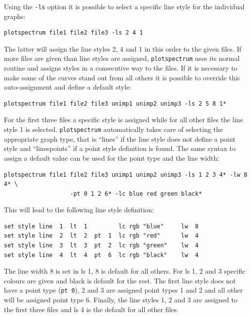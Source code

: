 \documentclass[12pt, a4paper]{article}
\begin{document}
Using the \verb'-ls' option it is possible to select a specific line style for the individual graphs:

\begin{verbatim}
plotspectrum file1 file2 file3 -ls 2 4 1
\end{verbatim}

The latter will assign the line styles 2, 4 and 1 in this order to the given files. If more files are given than line styles are assigned, \verb'plotspectrum' uses its normal routine and assigns styles in a consecutive way to the files. If it is necessary to make some of the curves stand out from all others it is possible to override this auto-assignment and define a default style:

\begin{verbatim}
plotspectrum file1 file2 file3 unimp1 unimp2 unimp3 -ls 2 5 8 1*
\end{verbatim}

For the first three files a specific style is assigned while for all other files the line style 1 is selected. \verb'plotspectrum' automatically takes care of selecting the appropriate graph type, that is ``lines'' if the line style does not define a point style and ``linespoints'' if a point style definition is found. The same syntax to assign a default value can be used for the point type and the line width:

\begin{verbatim}
plotspectrum file1 file2 file3 unimp1 unimp2 unimp3 -ls 1 2 3 4* -lw 8 4* \
                   -pt 0 1 2 6* -lc blue red green black*
\end{verbatim}

This will lead to the following line style definition:

\begin{verbatim}
set style line  1  lt  1         lc rgb "blue"     lw  8
set style line  2  lt  2  pt  1  lc rgb "red"      lw  4
set style line  3  lt  3  pt  2  lc rgb "green"    lw  4
set style line  4  lt  4  pt  6  lc rgb "black"    lw  4
\end{verbatim}

The line width 8 is set in ls 1, 8 is default for all others. For ls 1, 2 and 3 specific colours are given and black is default for the rest. The first line style does not have a point type (\verb'pt 0'), 2 and 3 are assigned point types 1 and 2 and all other will be assigned point type 6. Finally, the line styles 1, 2 and 3 are assigned to the first three files and ls 4 is the default for all other files.
\end{document}
